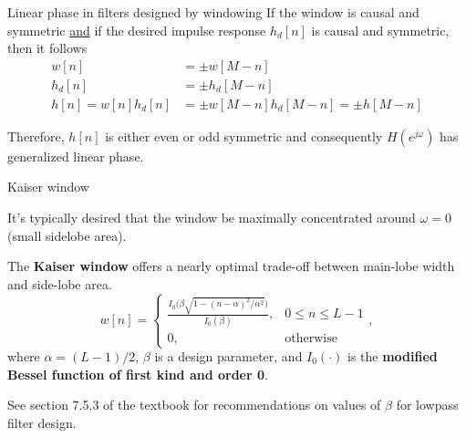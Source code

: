 \documentclass[10pt]{beamer}
\begin{document}
%
\begin{frame}{Linear phase in filters designed by windowing}
	If the window is causal and symmetric \underline{and} if the desired impulse response $h_d[n]$ is causal and symmetric, then it follows
	\begin{align}
		w[n] &= \pm w[M-n] \tag{causal and symmetric window} \\
		h_d[n] &= \pm h_d[M-n] \tag{causal and symmetric $h_d[n]$} \\
		h[n] = w[n]h_d[n] &= \pm w[M-n]h_d[M-n] = \pm h[M-n] \tag{causal and symmetric $h[n]$}
	\end{align}
	
	Therefore, $h[n]$ is either even or odd symmetric and consequently $H(e^{j\omega})$ has generalized linear phase.
	
\end{frame}

%
\begin{frame}{Kaiser window}

It's typically desired that the window be maximally concentrated around $\omega = 0$ (small sidelobe area).

The \textbf{Kaiser window} offers a nearly optimal trade-off between main-lobe width and side-lobe area.
\begin{equation*}
w[n] = \begin{cases}
\displaystyle\frac{I_0\Big(\beta\sqrt{1- (n-\alpha)^2/\alpha^2}\Big)}{I_0(\beta)}, & 0 \leq n \leq L-1 \\
0, & \text{otherwise}
\end{cases},
\end{equation*}
where $\alpha = (L-1)/2$, $\beta$ is a design parameter, and $I_0(\cdot)$ is the \textbf{modified Bessel function of first kind and order 0}.

See section 7.5.3 of the textbook for recommendations on values of $\beta$ for lowpass filter design.

\end{frame}
\end{document}
